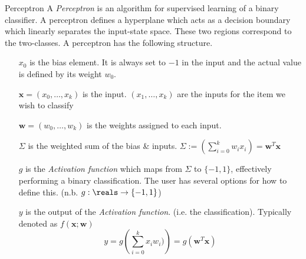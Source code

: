 \documentclass[11pt,a4paper]{article}
\begin{document}
  \begin{definition}{Perceptron}
    A \textit{Perceptron} is an algorithm for supervised learning of a binary classifier. A perceptron defines a hyperplane which acts as a decision boundary which linearly separates the input-state space. These two regions correspond to the two-classes. A perceptron has the following structure.

    \begin{center}\end{center}
    \begin{itemize}
      \item[$x_0$] is the bias element. It is always set to $-1$ in the input and the actual value is defined by its weight $w_0$.
      \item[$\pmb{x}=(x_0,\dots,x_k)$] is the input. $(x_1,\dots,x_k)$ are the inputs for the item we wish to classify
      \item[$\pmb{w}=(w_0,\dots,w_k)$] is the weights assigned to each input.
      \item[$\Sigma$] is the weighted sum of the bias \& inputs. $\Sigma:=(\sum_{i=0}^kw_ix_i)=\pmb{w}^T\pmb{x}$
      \item[$g$] is the \textit{Activation function} which maps from $\Sigma$ to $\{-1,1\}$, effectively performing a binary classification. The user has several options for how to define this. (n.b. $g:\reals\to\{-1,1\}$)
      \item[$y$] is the output of the \textit{Activation function}. (i.e. the classification). Typically denoted as $f(\pmb{x};\pmb{w})$ \[ y=g\left(\sum_{i=0}^kx_iw_i)\right)=g(\pmb{w}^T\pmb{x})\]
    \end{itemize}
  \end{definition}
\end{document}
